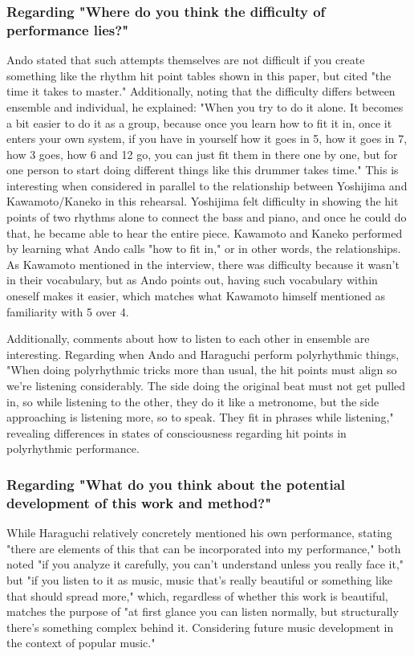 \subsubsection{Regarding "Where do you think the difficulty of performance lies?"}

Ando stated that such attempts themselves are not difficult if you create something like the rhythm hit point tables shown in this paper, but cited "the time it takes to master." Additionally, noting that the difficulty differs between ensemble and individual, he explained: "When you try to do it alone. It becomes a bit easier to do it as a group, because once you learn how to fit it in, once it enters your own system, if you have in yourself how it goes in 5, how it goes in 7, how 3 goes, how 6 and 12 go, you can just fit them in there one by one, but for one person to start doing different things like this drummer takes time." This is interesting when considered in parallel to the relationship between Yoshijima and Kawamoto/Kaneko in this rehearsal. Yoshijima felt difficulty in showing the hit points of two rhythms alone to connect the bass and piano, and once he could do that, he became able to hear the entire piece. Kawamoto and Kaneko performed by learning what Ando calls "how to fit in," or in other words, the relationships. As Kawamoto mentioned in the interview, there was difficulty because it wasn't in their vocabulary, but as Ando points out, having such vocabulary within oneself makes it easier, which matches what Kawamoto himself mentioned as familiarity with 5 over 4.

Additionally, comments about how to listen to each other in ensemble are interesting. Regarding when Ando and Haraguchi perform polyrhythmic things, "When doing polyrhythmic tricks more than usual, the hit points must align so we're listening considerably. The side doing the original beat must not get pulled in, so while listening to the other, they do it like a metronome, but the side approaching is listening more, so to speak. They fit in phrases while listening," revealing differences in states of consciousness regarding hit points in polyrhythmic performance.

\subsubsection{Regarding "What do you think about the potential development of this work and method?"}

While Haraguchi relatively concretely mentioned his own performance, stating "there are elements of this that can be incorporated into my performance," both noted "if you analyze it carefully, you can't understand unless you really face it," but "if you listen to it as music, music that's really beautiful or something like that should spread more," which, regardless of whether this work is beautiful, matches the purpose of "at first glance you can listen normally, but structurally there's something complex behind it. Considering future music development in the context of popular music."

